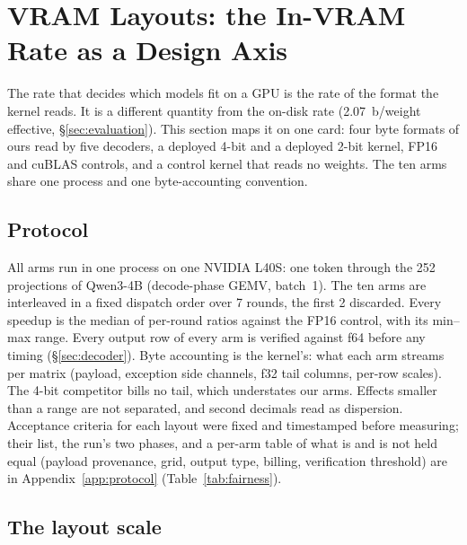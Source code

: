 \section{VRAM Layouts: the In-VRAM Rate as a Design Axis}
\label{sec:layouts}

The rate that decides which models fit on a GPU is the rate of the format
the kernel reads. It is a different quantity from the on-disk rate
(2.07~b/weight effective, \S\ref{sec:evaluation}). This section maps it on
one card: four byte formats of ours read by five decoders, a deployed 4-bit
and a deployed 2-bit kernel, FP16 and cuBLAS controls, and a control kernel
that reads no weights. The ten arms share one process and one
byte-accounting convention.

\subsection{Protocol}
\label{sec:protocol}

All arms run in one process on one NVIDIA L40S: one token through the 252
projections of Qwen3-4B (decode-phase GEMV, batch~1). The ten arms are
interleaved in a fixed dispatch order over 7 rounds, the first 2 discarded.
Every speedup is the median of per-round ratios against the FP16 control,
with its min--max range. Every output row of every arm is verified against
f64 before any timing (\S\ref{sec:decoder}). Byte accounting is the
kernel's: what each arm streams per matrix (payload, exception side
channels, f32 tail columns, per-row scales). The 4-bit competitor bills no
tail, which understates our arms. Effects smaller than a range are not
separated, and second decimals read as dispersion. Acceptance criteria for
each layout were fixed and timestamped before measuring; their list, the
run's two phases, and a per-arm table of what is and is not held equal
(payload provenance, grid, output type, billing, verification threshold)
are in Appendix~\ref{app:protocol} (Table~\ref{tab:fairness}).

\subsection{The layout scale}
\label{sec:scale}

